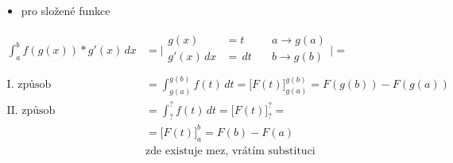 \begin{itemize}\item pro složené funkce\end{itemize}
\begin{align*}
  \int_a^bf(g(x))*g'(x)\,dx&=
  \Biggr|
    \begin{alignedat}{2}
      g(x) &=t \quad &a \rightarrow g(a) \\
      g'(x)\,dx &=\,dt \quad &b \rightarrow g(b) \\
    \end{alignedat}
  \Biggr| = \\
  \text{I. způsob} &= \int_{g(a)}^{g(b)}f(t)\,dt = \Bigr[F(t)\Bigr]_{g(a)}^{g(b)} = F(g(b))-F(g(a)) \\
  \text{II. způsob} &= \int_?^?f(t)\,dt=\Bigr[F(t)\Bigr]_?^? = \\
  &=\Bigr[F(t)\Bigr]_a^b = F(b)-F(a) \\
  & \text{zde existuje mez, vrátím substituci}
\end{align*}

